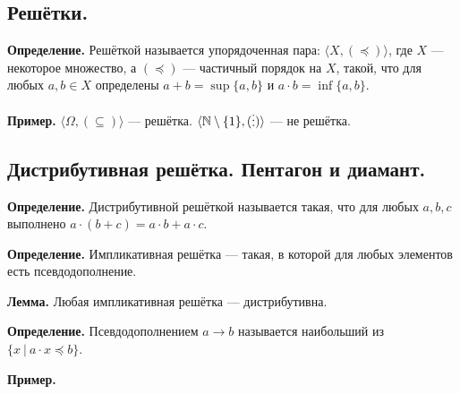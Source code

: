 \documentclass[10pt,a4paper,oneside]{article}
\begin{document}
\subsection{Решётки.}
\noindent \textbf{ Определение. } 
Решёткой называется упорядоченная пара: $\langle X, (\preceq)\rangle$, 
где $X$ --- некоторое множество, а $(\preceq)$ --- частичный порядок на $X$, такой, 
что для любых $a,b \in X$ определены $a + b = \sup\{a,b\}$ и $a \cdot b = \inf\{a,b\}$.

\noindent \textbf{ Пример. } 
$\langle\Omega, (\subseteq)\rangle$ --- решётка.
$\langle\mathbb{N}\setminus\{1\}, (\raisebox{-0.75pt}{\vdots})\rangle$ --- не решётка.

\subsection{Дистрибутивная решётка. Пентагон и диамант.}

\noindent \textbf{ Определение. } 
Дистрибутивной решёткой называется такая, что для любых $a,b,c$ выполнено
$a \cdot (b + c) = a \cdot b + a \cdot c$.

\noindent \textbf{ Определение. } 
Импликативная решётка --- такая, в которой для любых элементов есть псевдодополнение.

\noindent \textbf{ Лемма. } 
Любая импликативная решётка --- дистрибутивна.

\noindent \textbf{ Определение. }
Псевдодополнением $a \rightarrow b$ называется наибольший из $\{ x \ |\ a \cdot x \preceq b\}$.

\noindent \textbf{ Пример. } 

\begin{center}\end{center}
\end{document}
